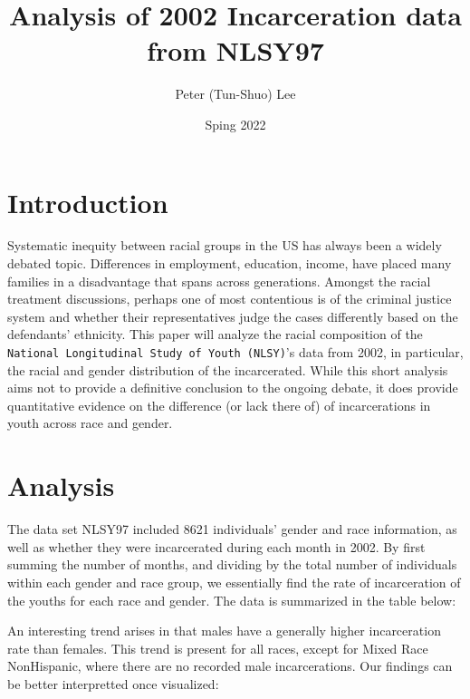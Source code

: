 \documentclass{article}
\author{Peter (Tun-Shuo) Lee }
\title{Analysis of 2002 Incarceration data from NLSY97}
\date{Sping 2022}
\begin{document}
\maketitle

\section{Introduction}

Systematic inequity between racial groups in the US has always been a widely debated topic. Differences in employment, education, income, have placed 
many families in a disadvantage that spans across generations. Amongst the racial treatment discussions, perhaps one of most contentious is of the criminal 
justice system and whether their representatives judge the cases differently based on the defendants' ethnicity. This paper will analyze the racial composition 
of the \texttt{National Longitudinal Study of Youth (NLSY)}'s data from 2002, in particular, the racial and gender distribution of the incarcerated. While this short analysis aims not to provide
a definitive conclusion to the ongoing debate, it does provide quantitative evidence on the difference (or lack there of) of incarcerations in youth across race and gender.  

\newpage

\section{Analysis}
The data set NLSY97 included 8621 individuals' gender and race information, as well as whether they were incarcerated during each month in 2002. 
By first summing the number of months, and dividing by the total number of individuals within each gender and race group, we essentially find the 
rate of incarceration of the youths for each race and gender. The data is summarized in the table below: 



An interesting trend arises in that males have a generally higher incarceration rate than females. This trend is present for all races, except for Mixed Race NonHispanic, where there are no recorded 
male incarcerations. Our findings can be better interpretted once visualized: 
\end{document}
